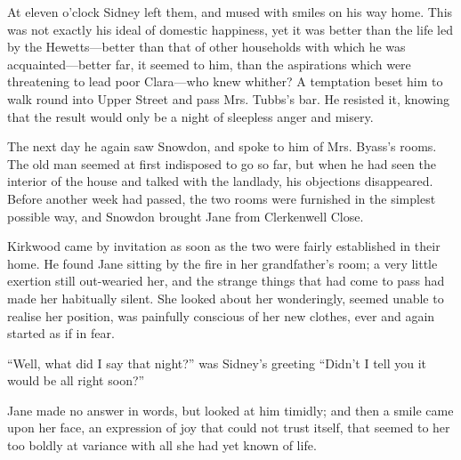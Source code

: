 At eleven o'clock Sidney left them, and mused with smiles on his way
home. This was not exactly his ideal of domestic happiness, yet it was
better than the life led by the Hewetts---better than that of other
households with which he was acquainted---better far, it seemed to him,
than the aspirations which were threatening to lead poor Clara---who
knew whither? A temptation beset him to walk round into Upper Street and
pass Mrs. Tubbs's bar. He resisted it, knowing that the result would
only be a night of sleepless anger and misery.

The next day he again saw Snowdon, and spoke to him of Mrs. Byass's
rooms. The old man seemed at first indisposed to go so far, but when he
had seen the interior of the house and talked with the landlady, his
objections disappeared. Before another week had passed, the two rooms
were furnished {\protect\hypertarget{165}{}{}}in the simplest possible
way, and Snowdon brought Jane from Clerkenwell Close.

Kirkwood came by invitation as soon as the two were fairly established
in their home. He found Jane sitting by the fire in her grandfather's
room; a very little exertion still out-wearied her, and the strange
things that had come to pass had made her habitually silent. She looked
about her wonderingly, seemed unable to realise her position, was
painfully conscious of her new clothes, ever and again started as if in
fear.

``Well, what did I say that night?'' was Sidney's greeting ``Didn't I
tell you it would be all right soon?''

Jane made no answer in words, but looked at him timidly; and then a
smile came upon her face, an expression of joy that could not trust
itself, that seemed to her too boldly at variance with all she had yet
known of life.
